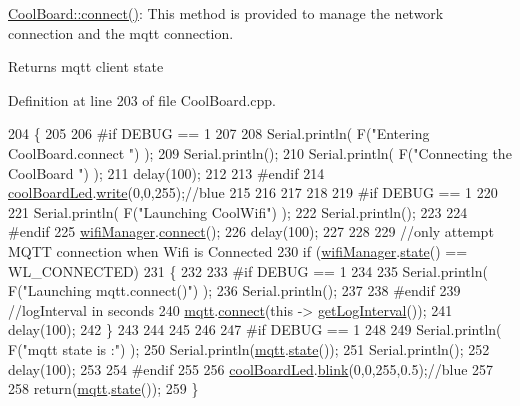 \hyperlink{class_cool_board_a519de78b807f8ec6463ff484eb925918}{Cool\+Board\+::connect()}\+: This method is provided to manage the network connection and the mqtt connection.

\begin{DoxyReturn}{Returns}
mqtt client state 
\end{DoxyReturn}


Definition at line 203 of file Cool\+Board.\+cpp.


\begin{DoxyCode}
204 \{
205 
206 \textcolor{preprocessor}{#if DEBUG == 1  }
207 
208     Serial.println( F(\textcolor{stringliteral}{"Entering CoolBoard.connect "}) );
209     Serial.println();
210     Serial.println( F(\textcolor{stringliteral}{"Connecting the CoolBoard  "}) );
211     delay(100);
212 
213 \textcolor{preprocessor}{#endif}
214     \hyperlink{class_cool_board_a1b1d3c684a5baa56b08486e192fd8e97}{coolBoardLed}.\hyperlink{class_cool_board_led_a30fadd4cbec17ceea428bf7a32207e87}{write}(0,0,255);\textcolor{comment}{//blue}
215 
216     
217             
218     
219 \textcolor{preprocessor}{#if DEBUG == 1      }
220 
221     Serial.println( F(\textcolor{stringliteral}{"Launching CoolWifi"}) );
222     Serial.println();
223 
224 \textcolor{preprocessor}{#endif}
225     \hyperlink{class_cool_board_acd88e6003606b47479ebba81e4aceeca}{wifiManager}.\hyperlink{class_cool_wifi_ad060353050f40d032a2dbf9e54a768bf}{connect}();
226     delay(100);
227 
228 
229     \textcolor{comment}{//only attempt MQTT connection when Wifi is Connected}
230     \textcolor{keywordflow}{if} (\hyperlink{class_cool_board_acd88e6003606b47479ebba81e4aceeca}{wifiManager}.\hyperlink{class_cool_wifi_a1c7b4d82a4098d346e7593dce92039fa}{state}() == WL\_CONNECTED)
231     \{
232 
233 \textcolor{preprocessor}{    #if DEBUG == 1  }
234     
235         Serial.println( F(\textcolor{stringliteral}{"Launching mqtt.connect()"}) );
236         Serial.println();
237     
238 \textcolor{preprocessor}{    #endif  }
239         \textcolor{comment}{//logInterval in seconds}
240         \hyperlink{class_cool_board_a2399f44d7c23c1149a335cb3b46d90f1}{mqtt}.\hyperlink{class_cool_m_q_t_t_a50075d0ab23a327ab897fd6adad20eda}{connect}(\textcolor{keyword}{this} -> \hyperlink{class_cool_board_a7508e029f2ee17bb747ffab599285e0d}{getLogInterval}());
241         delay(100);
242     \}
243     
244         
245     
246     
247 \textcolor{preprocessor}{#if DEBUG == 1}
248 
249     Serial.println( F(\textcolor{stringliteral}{"mqtt state is :"}) );
250     Serial.println(\hyperlink{class_cool_board_a2399f44d7c23c1149a335cb3b46d90f1}{mqtt}.\hyperlink{class_cool_m_q_t_t_a5d003307eff78efbd585e42b43b72b6d}{state}());
251     Serial.println();
252     delay(100);
253 
254 \textcolor{preprocessor}{#endif}
255 
256     \hyperlink{class_cool_board_a1b1d3c684a5baa56b08486e192fd8e97}{coolBoardLed}.\hyperlink{class_cool_board_led_a96e1ea13003eee34c9dbcef340404426}{blink}(0,0,255,0.5);\textcolor{comment}{//blue}
257 
258     \textcolor{keywordflow}{return}(\hyperlink{class_cool_board_a2399f44d7c23c1149a335cb3b46d90f1}{mqtt}.\hyperlink{class_cool_m_q_t_t_a5d003307eff78efbd585e42b43b72b6d}{state}());
259 \}
\end{DoxyCode}
